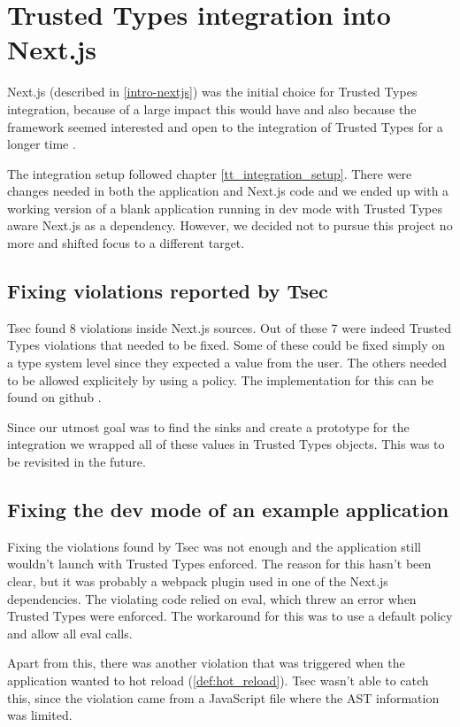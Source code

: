 \chapter{Trusted Types integration into Next.js}

Next.js (described in \ref{intro-nextjs}) was the initial choice for Trusted Types integration,
because of a large impact this would have and also because the framework seemed interested and open
to the integration of Trusted Types for a longer time \cite{nextjs_tt_pr_2020}.

The integration setup followed chapter \ref{tt_integration_setup}. There were changes needed in both
the application and Next.js code and we ended up with a working version of a blank application
running in dev mode with Trusted Types aware Next.js as a dependency. However, we decided not to
pursue this project no more and shifted focus to a different target.


\section{Fixing violations reported by Tsec}

Tsec found 8 violations \cite{tsec_output} inside Next.js sources. Out of these 7 were indeed
Trusted Types violations that needed to be fixed. Some of these could be fixed simply on a type
system level since they expected a value from the user. The others needed to be allowed explicitely
by using a policy. The implementation for this can be found on github
\cite{nextjs_fix_tsec_violations_commit}.

Since our utmost goal was to find the sinks and create a prototype for the integration we wrapped
all of these values in Trusted Types objects. This was to be revisited in the future.

\section{Fixing the dev mode of an example application}

Fixing the violations found by Tsec was not enough and the application still wouldn't launch with
Trusted Types enforced. The reason for this hasn't been clear, but it was probably a webpack plugin
used in one of the Next.js dependencies. The violating code relied on eval, which threw an error
when Trusted Types were enforced. The workaround for this was to use a default policy and allow all
eval calls.

Apart from this, there was another violation that was triggered when the application wanted to hot
reload (\ref{def:hot_reload}). Tsec wasn't able to catch this, since the violation came from a
JavaScript file where the AST information was limited.
